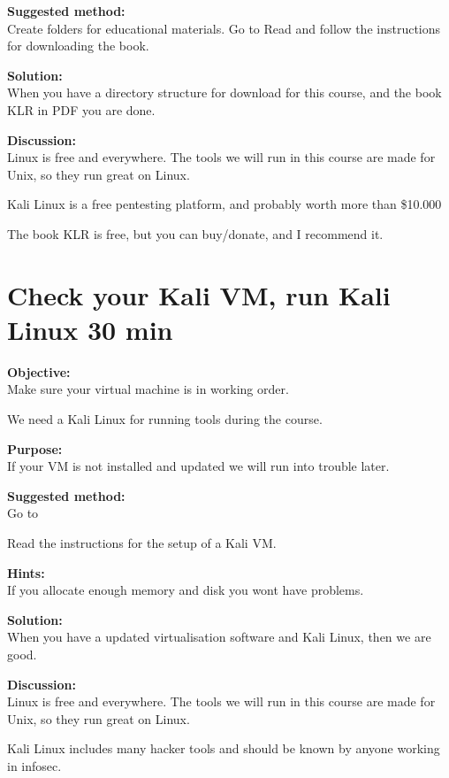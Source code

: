 \documentclass[a4paper,11pt,notitlepage]{report}
\begin{document}
{\bf Suggested method:}\\
Create folders for educational materials. Go to 
Read and follow the instructions for downloading the book.

{\bf Solution:}\\
When you have a directory structure for download for this course, and the book KLR in PDF you are done.

{\bf Discussion:}\\
Linux is free and everywhere. The tools we will run in this course are made for Unix, so they run great on Linux.

Kali Linux is a free pentesting platform, and probably worth more than \$10.000

The book KLR is free, but you can buy/donate, and I recommend it.

\chapter{Check your Kali VM, run Kali Linux 30 min}
\label{ex:sw-basicVM}


{\bf Objective:}\\
Make sure your virtual machine is in working order.

We need a Kali Linux for running tools during the course.

{\bf Purpose:}\\
If your VM is not installed and updated we will run into trouble later.

{\bf Suggested method:}\\
Go to 

Read the instructions for the setup of a Kali VM.

{\bf Hints:}\\
If you allocate enough memory and disk you wont have problems.

{\bf Solution:}\\
When you have a updated virtualisation software and Kali Linux, then we are good.

{\bf Discussion:}\\
Linux is free and everywhere. The tools we will run in this course are made for Unix, so they run great on Linux.

Kali Linux includes many hacker tools and should be known by anyone working in infosec.
\end{document}
